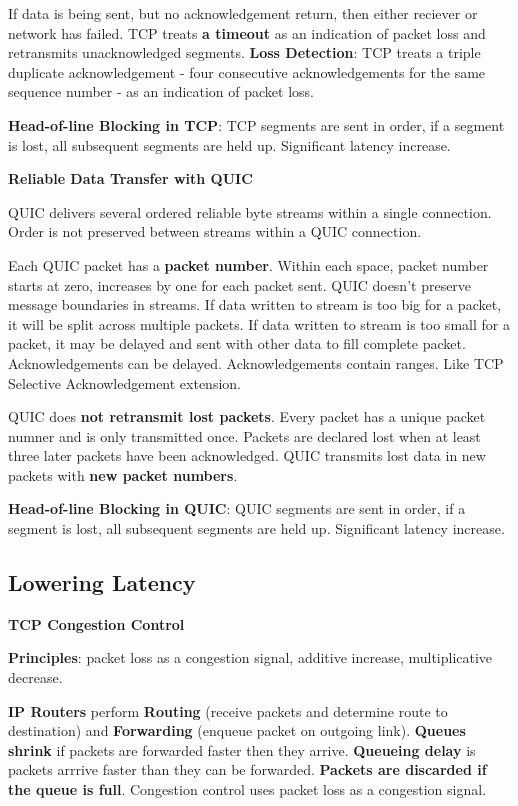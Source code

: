 \documentclass{article}
\begin{document}
If data is being sent, but no acknowledgement return, then either reciever or network has failed.
TCP treats \textbf{a timeout} as an indication of packet loss and retransmits unacknowledged segments.
\textbf{Loss Detection}: TCP treats a triple duplicate acknowledgement {-} four consecutive acknowledgements for the same sequence
number {-} as an indication of packet loss.

\textbf{Head-of-line Blocking in TCP}: TCP segments are sent in order, if a segment is lost, all subsequent segments are held up.
Significant latency increase.

\vspace{\baselineskip}
\textbf{Reliable Data Transfer with QUIC}

QUIC delivers several ordered reliable byte streams within a single connection.
Order is not preserved between streams within a QUIC connection.

Each QUIC packet has a \textbf{packet number}.
Within each space, packet number starts at zero, increases by one for each packet sent.
QUIC doesn't preserve message boundaries in streams.
If data written to stream is too big for a packet, it will be split across multiple packets.
If data written to stream is too small for a packet, it may be delayed and sent with other data to fill complete packet.
Acknowledgements can be delayed.
Acknowledgements contain ranges.
Like TCP Selective Acknowledgement extension.

QUIC does \textbf{not retransmit lost packets}. Every packet has a unique packet numner and is only transmitted once.
Packets are declared lost when at least three later packets have been acknowledged.
QUIC transmits lost data in new packets with \textbf{new packet numbers}.

\textbf{Head-of-line Blocking in QUIC}: QUIC segments are sent in order, if a segment is lost, all subsequent segments are held up.
Significant latency increase.

\clearpage

\subsection*{Lowering Latency}

\textbf{TCP Congestion Control}

\textbf{Principles}: packet loss as a congestion signal, additive increase, multiplicative decrease.

\textbf{IP Routers} perform \textbf{Routing} (receive packets and determine route to destination) and
\textbf{Forwarding} (enqueue packet on outgoing link).
\textbf{Queues shrink} if packets are forwarded faster then they arrive.
\textbf{Queueing delay} is packets arrrive faster than they can be forwarded.
\textbf{Packets are discarded if the queue is full}.
Congestion control uses packet loss as a congestion signal.
\end{document}
